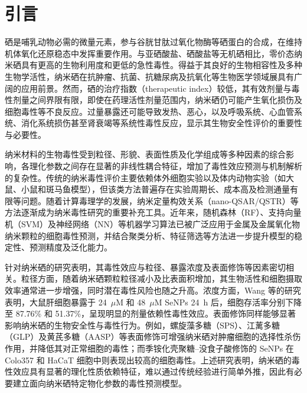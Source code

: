 \section{引言}

硒是哺乳动物必需的微量元素，参与谷胱甘肽过氧化物酶等硒蛋白的合成，在维持机体氧化还原稳态中发挥重要作用。与亚硒酸盐、硒酸盐等无机硒相比，零价态纳米硒具有更高的生物利用度和更低的急性毒性。得益于其良好的生物相容性及多种生物学活性，纳米硒在抗肿瘤、抗菌、抗糖尿病及抗氧化等生物医学领域展具有广阔的应用前景\cite{hosnedlova2018nanoselenium,bisht2022senps,sowmya2024nanoselenium,karthik2024senps}。然而，硒的治疗指数（therapeutic index）较低，其有效剂量与毒性剂量之间界限有限，即使在药理活性剂量范围内，纳米硒仍可能产生氧化损伤及细胞毒性等不良反应\cite{wang2020prooxidation}。过量暴露还可能导致发热、恶心，以及呼吸系统、心血管系统、消化系统损伤甚至肾衰竭等系统性毒性反应\cite{hosnedlova2018nanoselenium}，显示其生物安全性评价的重要性与必要性。
 
纳米材料的生物毒性受到粒径、形貌、表面性质及化学组成等多种因素的综合影响，各理化参数之间存在显著的非线性耦合特征，增加了毒性效应预测与机制解析的复杂性\cite{ji2025rosml}。传统的纳米毒性评价主要依赖体外细胞实验以及体内动物实验（如大鼠、小鼠和斑马鱼模型），但该类方法普遍存在实验周期长、成本高及检测通量有限等问题\cite{ahmadi2024toxicity}。随着计算毒理学的发展，纳米定量构效关系（nano-QSAR/QSTR）等方法逐渐成为纳米毒性研究的重要补充工具\cite{roy2023tio2}。近年来，随机森林（RF）、支持向量机（SVM）及神经网络（NN）等机器学习算法已被广泛应用于金属及金属氧化物纳米颗粒的细胞毒性预测\cite{zhang2023qsar}，并结合聚类分析、特征筛选等方法进一步提升模型的稳定性、预测精度及泛化能力\cite{sang2022mlcytotoxicity}。
 
针对纳米硒的研究表明，其毒性效应与粒径、暴露浓度及表面修饰等因素密切相关。粒径方面，随着纳米硒颗粒粒径减小及比表面积增加，其生物活性和细胞摄取效率通常进一步增强，同时潜在毒性风险也随之升高\cite{zhang2023senpsbio}。浓度方面，Wang 等\cite{wang2020prooxidation}的研究表明，大鼠肝细胞暴露于 24~$\mu$M 和 48~$\mu$M SeNPs 24~h 后，细胞存活率分别下降至 87.76\% 和 51.37\%，呈现明显的剂量依赖性毒性效应。表面修饰同样能够显著影响纳米硒的生物安全性与毒性行为。例如，螺旋藻多糖（SPS）、江蓠多糖（GLP）及黄芪多糖（AASP）等表面修饰可增强纳米硒对肿瘤细胞的选择性杀伤作用，并降低其对正常细胞的毒性\cite{zhang2023senpsbio,ji2023astragalus}；而季铵化壳聚糖--没食子酸修饰的 SeNPs 在 Colo357 和 HaCaT 细胞中则表现出较高的细胞毒性\cite{lunkov2023chitosan}。上述研究表明，纳米硒的毒性效应具有显著的理化性质依赖特征，难以通过传统经验进行简单外推，因此有必要建立面向纳米硒特定物化参数的毒性预测模型。
 
